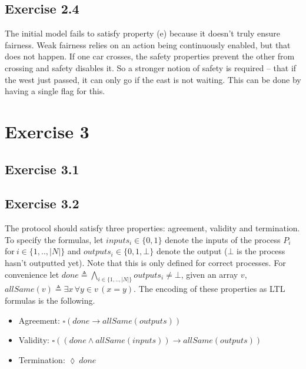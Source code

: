 \documentclass[12pt]{article}
\newcommand{\drafter}[1]{#1}
\begin{document}
\begin{enumerate}[label=\roman*.]
\subsection*{Exercise 2.4}

\drafter{The initial model fails to satisfy property (e) because it doesn't truly ensure fairness.}
\drafter{Weak fairness relies on an action being continuously enabled, but that does not happen.}
\drafter{If one car crosses, the safety properties prevent the other from crossing and safety disables it.}
\drafter{So a stronger notion of safety is required -- that if the west just passed, it can only go if the east is not waiting.}
\drafter{This can be done by having a single flag for this.}

\section*{Exercise 3}

\subsection*{Exercise 3.1}


\subsection*{Exercise 3.2}

\drafter{The protocol should satisfy three properties: agreement, validity and termination.}
\drafter{To specify the formulas, let $inputs_i \in \{0,1\}$ denote the inputs of the process $P_i ~$for$~ i \in \{1, .., |N|\}$ and $outputs_i \in \{0,1, \bot\}$ denote the output ($\bot$ is the process hasn't outputted yet).}
\drafter{Note that this is only defined for correct processes.}
\drafter{For convenience let $done \triangleq \bigwedge_{i \in \{1, .., |N|\}} outputs_i \neq \bot$, given an array $v$, $allSame(v) \triangleq \exists x \, \forall y \in v \, (x = y)$.}
\drafter{The encoding of these properties as LTL formulas is the following.}

\begin{itemize}
  \item Agreement: $\square (done \rightarrow allSame(outputs))$
  \item Validity: $\square ((done \wedge allSame(inputs)) \rightarrow allSame(outputs))$
  \item Termination: $\lozenge~done$
\end{itemize}


\end{enumerate}
\end{document}

